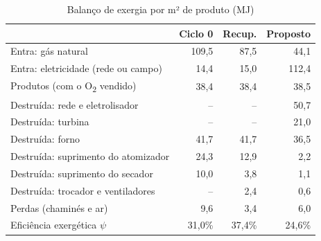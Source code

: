 \documentclass[10pt,a4paper,twocolumn]{article}
\newcommand{\Ot}{O\textsubscript{2}}
\begin{document}
\begin{table}[!t]
\centering
\caption{Balanço de exergia por m² de produto (MJ)}\label{tab:exergia}
\footnotesize
\begin{tabular}{L{3.55cm}rrr}
\toprule
& \textbf{Ciclo 0} & \textbf{Recup.} & \textbf{Proposto}\\ \midrule
Entra: gás natural & 109,5 & 87,5 & 44,1\\
Entra: eletricidade (rede ou campo) & 14,4 & 15,0 & 112,4\\
Produtos (com o \Ot{} vendido) & 38,4 & 38,4 & 38,5\\
Destruída: rede e eletrolisador & -- & -- & 50,7\\
Destruída: turbina & -- & -- & 21,0\\
Destruída: forno & 41,7 & 41,7 & 36,5\\
Destruída: suprimento do atomizador & 24,3 & 12,9 & 2,2\\
Destruída: suprimento do secador & 10,0 & 3,8 & 1,1\\
Destruída: trocador e ventiladores & -- & 2,4 & 0,6\\
Perdas (chaminés e ar) & 9,6 & 3,4 & 6,0\\
\midrule
Eficiência exergética $\psi$ & 31,0\% & 37,4\% & 24,6\%\\
\bottomrule
\end{tabular}
\end{table}
\end{document}
